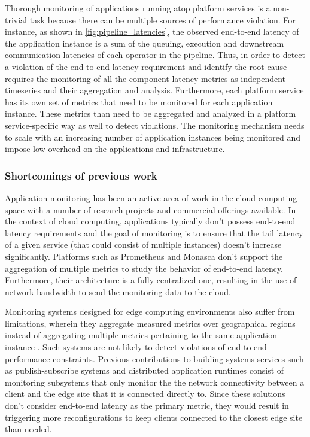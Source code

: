 \par Thorough monitoring of applications running atop platform services is a non-trivial task because there can be multiple sources of performance violation. For instance, as shown in \cref{fig:pipeline_latencies}, the observed end-to-end latency of the application instance is a sum of the queuing, execution and downstream communication latencies of each operator in the pipeline.  Thus, in order to detect a violation of the end-to-end latency requirement and identify the root-cause requires the monitoring of all the component latency metrics as independent timeseries and their aggregation and analysis. Furthermore, each platform service has its own set of metrics that need to be monitored for each application instance. These metrics than need to be aggregated and analyzed in a platform service-specific way as well to detect violations. The monitoring mechanism needs to scale with an increasing number of application instances being monitored and impose low overhead on the applications and infrastructure.

\subsubsection{Shortcomings of previous work}
\par Application monitoring has been an active area of work in the cloud computing space with a number of research projects and commercial offerings available. In the context of cloud computing, applications typically don't possess end-to-end latency requirements and the goal of monitoring is to ensure that the tail latency of a given service (that could consist of multiple instances) doesn't increase significantly. Platforms such as Prometheus \cite{prometheus} and Monasca \cite{monasca} don't support the aggregation of multiple metrics to study the behavior of end-to-end latency. Furthermore, their architecture is a fully centralized one, resulting in the use of network bandwidth to send the monitoring data to the cloud.
\par Monitoring systems designed for edge computing environments also suffer from limitations, wherein they aggregate measured metrics over geographical regions instead of aggregating multiple metrics pertaining to the same application instance \cite{fmone, gonccalves2021dynamic}. Such systems are not likely to detect violations of end-to-end performance constraints. Previous contributions to building systems services such as publish-subscribe systems \cite{emma} and distributed application runtimes \cite{foglets} consist of monitoring subsystems that only monitor the the network connectivity between a client and the edge site that it is connected directly to. Since these solutions don't consider end-to-end latency as the primary metric, they would result in triggering more reconfigurations to keep clients connected to the closest edge site than needed.

